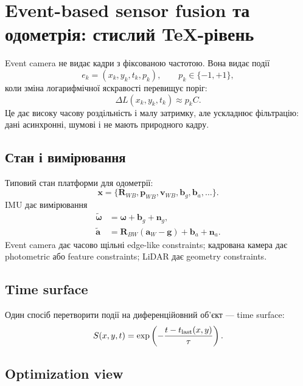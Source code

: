 \chapter{Event-based sensor fusion та одометрія: стислий TeX-рівень}
\label{chap:event-fusion-odometry}


Event camera не видає кадри з фіксованою частотою. Вона видає події
\begin{equation}
 e_k=(x_k,y_k,t_k,p_k),\qquad p_k\in\{-1,+1\},
\end{equation}
коли зміна логарифмічної яскравості перевищує поріг:
\begin{equation}
 \Delta L(x_k,y_k,t_k)\approx p_k C.
\end{equation}
Це дає високу часову роздільність і малу затримку, але ускладнює фільтрацію: дані асинхронні, шумові і не мають природного кадру.

\section{Стан і вимірювання}

Типовий стан платформи для одометрії:
\begin{equation}
 \mathbf{x}=\{\mathbf{R}_{WB},\mathbf{p}_{WB},\mathbf{v}_{WB},\mathbf{b}_g,\mathbf{b}_a,\ldots\}.
\end{equation}
IMU дає вимірювання
\begin{align}
 \tilde{\boldsymbol\omega} &= \boldsymbol\omega + \mathbf{b}_g + \mathbf{n}_g,\\
 \tilde{\mathbf{a}} &= \mathbf{R}_{BW}(\mathbf{a}_W-\mathbf{g}) + \mathbf{b}_a + \mathbf{n}_a.
\end{align}
Event camera дає часово щільні edge-like constraints; кадрована камера дає photometric або feature constraints; LiDAR дає geometry constraints.

\section{Time surface}

Один спосіб перетворити події на диференційовний об'єкт --- time surface:
\begin{equation}
 S(x,y,t)=\exp\left(-\frac{t-t_{\rm last}(x,y)}{\tau}\right).
\end{equation}

\section{Optimization view}

